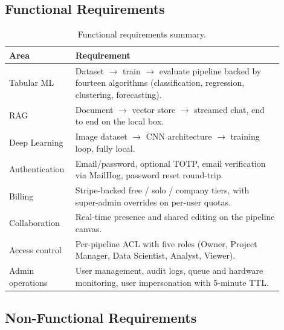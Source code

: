 \documentclass[12pt, a4paper, oneside]{report}
\begin{document}
\subsection{Functional Requirements}

\begin{table}[H]
\centering
\caption{Functional requirements summary.}
\label{tab:functional_reqs}
\begin{tabular}{|p{0.18\linewidth}|L{0.72\linewidth}|}
\hline
\textbf{Area} & \textbf{Requirement} \\
\hline
Tabular ML & Dataset $\to$ train $\to$ evaluate pipeline backed by fourteen algorithms (classification, regression, clustering, forecasting). \\ \hline
RAG & Document $\to$ vector store $\to$ streamed chat, end to end on the local box. \\ \hline
Deep Learning & Image dataset $\to$ CNN architecture $\to$ training loop, fully local. \\ \hline
Authentication & Email/password, optional TOTP, email verification via MailHog, password reset round-trip. \\ \hline
Billing & Stripe-backed free / solo / company tiers, with super-admin overrides on per-user quotas. \\ \hline
Collaboration & Real-time presence and shared editing on the pipeline canvas. \\ \hline
Access control & Per-pipeline ACL with five roles (Owner, Project Manager, Data Scientist, Analyst, Viewer). \\ \hline
Admin operations & User management, audit logs, queue and hardware monitoring, user impersonation with 5-minute TTL. \\
\hline
\end{tabular}
\end{table}

\subsection{Non-Functional Requirements}
\end{document}
